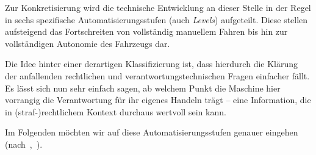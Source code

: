 \documentclass[twocolumn, german]{tum-article}
\begin{document}
Zur Konkretisierung wird die technische Entwicklung an dieser Stelle in der Regel in sechs spezifische Automatisierungsstufen (auch \emph{Levels}) aufgeteilt.
Diese stellen aufsteigend das Fortschreiten von vollständig manuellem Fahren bis hin zur vollständigen Autonomie des Fahrzeugs dar.

Die Idee hinter einer derartigen Klassifizierung ist, dass hierdurch die Klärung der anfallenden rechtlichen und verantwortungstechnischen Fragen einfacher fällt.
Es lässt sich nun sehr einfach sagen, ab welchem Punkt die Maschine hier vorrangig die Verantwortung für ihr eigenes Handeln trägt -- eine Information, die in (straf-)rechtlichem Kontext durchaus wertvoll sein kann.

Im Folgenden möchten wir auf diese Automatisierungsstufen genauer eingehen (nach~\cite{sae-levels},~\cite{bast-levels}).
\end{document}
